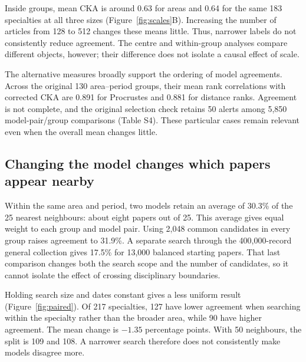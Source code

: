 Inside groups, mean CKA is around 0.63 for areas and 0.64 for the same 183 specialties at all three sizes (Figure~\ref{fig:scales}B). Increasing the number of articles from 128 to 512 changes these means little. Thus, narrower labels do not consistently reduce agreement. The centre and within-group analyses compare different objects, however; their difference does not isolate a causal effect of scale.

The alternative measures broadly support the ordering of model agreements. Across the original 130 area--period groups, their mean rank correlations with corrected CKA are 0.891 for Procrustes and 0.881 for distance ranks. Agreement is not complete, and the original selection check retains 50 alerts among 5,850 model-pair/group comparisons (Table S4). These particular cases remain relevant even when the overall mean changes little.

\subsection{Changing the model changes which papers appear nearby}
Within the same area and period, two models retain an average of 30.3\% of the 25 nearest neighbours: about eight papers out of 25. This average gives equal weight to each group and model pair. Using 2,048 common candidates in every group raises agreement to 31.9\%. A separate search through the 400,000-record general collection gives 17.5\% for 13,000 balanced starting papers. That last comparison changes both the search scope and the number of candidates, so it cannot isolate the effect of crossing disciplinary boundaries.

Holding search size and dates constant gives a less uniform result (Figure~\ref{fig:paired}). Of 217 specialties, 127 have lower agreement when searching within the specialty rather than the broader area, while 90 have higher agreement. The mean change is $-1.35$ percentage points. With 50 neighbours, the split is 109 and 108. A narrower search therefore does not consistently make models disagree more.

